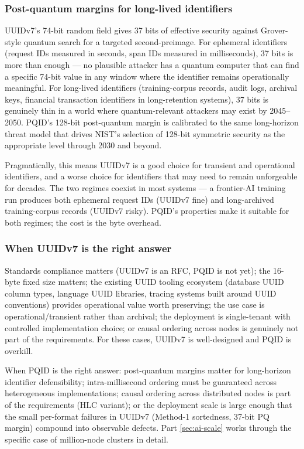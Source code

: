 \subsubsection{Post-quantum margins for long-lived identifiers}

UUIDv7's 74-bit random field gives 37 bits of effective security against Grover-style quantum search for a targeted second-preimage. For ephemeral identifiers (request IDs measured in seconds, span IDs measured in milliseconds), 37 bits is more than enough --- no plausible attacker has a quantum computer that can find a specific 74-bit value in any window where the identifier remains operationally meaningful. For long-lived identifiers (training-corpus records, audit logs, archival keys, financial transaction identifiers in long-retention systems), 37 bits is genuinely thin in a world where quantum-relevant attackers may exist by 2045--2050. PQID's 128-bit post-quantum margin is calibrated to the same long-horizon threat model that drives NIST's selection of 128-bit symmetric security as the appropriate level through 2030 and beyond.

Pragmatically, this means UUIDv7 is a good choice for transient and operational identifiers, and a worse choice for identifiers that may need to remain unforgeable for decades. The two regimes coexist in most systems --- a frontier-AI training run produces both ephemeral request IDs (UUIDv7 fine) and long-archived training-corpus records (UUIDv7 risky). PQID's properties make it suitable for both regimes; the cost is the byte overhead.

\subsubsection{When UUIDv7 is the right answer}

Standards compliance matters (UUIDv7 is an RFC, PQID is not yet); the 16-byte fixed size matters; the existing UUID tooling ecosystem (database UUID column types, language UUID libraries, tracing systems built around UUID conventions) provides operational value worth preserving; the use case is operational/transient rather than archival; the deployment is single-tenant with controlled implementation choice; or causal ordering across nodes is genuinely not part of the requirements. For these cases, UUIDv7 is well-designed and PQID is overkill.

When PQID is the right answer: post-quantum margins matter for long-horizon identifier defensibility; intra-millisecond ordering must be guaranteed across heterogeneous implementations; causal ordering across distributed nodes is part of the requirements (HLC variant); or the deployment scale is large enough that the small per-format failures in UUIDv7 (Method-1 sortedness, 37-bit PQ margin) compound into observable defects. Part \ref{sec:ai-scale} works through the specific case of million-node clusters in detail.

